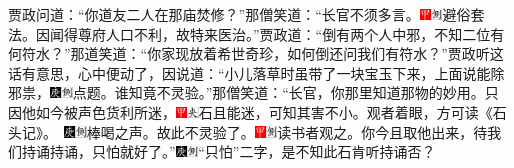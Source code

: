 贾政问道：``你道友二人在那庙焚修？''那僧笑道：``长官不须多言。{\includegraphics[width=3mm]{../Images/00002}\includegraphics[width=3mm]{../Images/00011}\footnotesize \kaishu 避俗套法。}因闻得尊府人口不利，故特来医治。''贾政道：``倒有两个人中邪，不知二位有何符水？''那道笑道：``你家现放着希世奇珍，如何倒还问我们有符水？''贾政听这话有意思，心中便动了，因说道：``小儿落草时虽带了一块宝玉下来，上面说能除邪祟，{\includegraphics[width=3mm]{../Images/00004}\includegraphics[width=3mm]{../Images/00011}\footnotesize \kaishu 点题。}谁知竟不灵验。''那僧笑道：``长官，你那里知道那物的妙用。只因他如今被声色货利所迷，{\includegraphics[width=3mm]{../Images/00002}\includegraphics[width=3mm]{../Images/00012}\footnotesize \kaishu 石且能迷，可知其害不小。观者着眼，方可读《石头记》。　\includegraphics[width=3mm]{../Images/00004}\includegraphics[width=3mm]{../Images/00011}\footnotesize \kaishu 棒喝之声。}故此不灵验了。{\includegraphics[width=3mm]{../Images/00002}\includegraphics[width=3mm]{../Images/00011}\footnotesize \kaishu 读书者观之。}你今且取他出来，待我们持诵持诵，只怕就好了。''{\includegraphics[width=3mm]{../Images/00004}\includegraphics[width=3mm]{../Images/00011}\footnotesize \kaishu ``只怕''二字，是不知此石肯听持诵否？}

